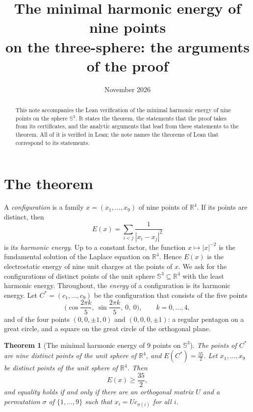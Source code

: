\documentclass[reqno,a4paper,11pt]{amsart}
\numberwithin{equation}{section}
\newtheorem{theorem}{Theorem}[section]
\def\R{{\mathbb R}}
\newcommand{\Sph}{\mathbb{S}}
\begin{document}
\title[The harmonic energy of nine points on the three-sphere]{The minimal harmonic energy of nine points\\ on the three-sphere: the arguments of the proof}

\date{November 2026}

\begin{abstract}
This note accompanies the Lean verification of the minimal harmonic energy of nine points on the sphere $\Sph^3$. It states the theorem, the statements that the proof takes from its certificates, and the analytic arguments that lead from these statements to the theorem. All of it is verified in Lean; the note names the theorems of Lean that correspond to its statements.
\end{abstract}

\maketitle

\section{The theorem}\label{sec:theorem}

A \emph{configuration} is a family $x = (x_1, \dots, x_9)$ of nine points of $\R^4$. If its points are distinct, then
$$
E(x) = \sum_{i<j} \frac{1}{|x_i - x_j|^2}
$$
is its \emph{harmonic energy}. Up to a constant factor, the function $x \mapsto |x|^{-2}$ is the fundamental solution of the Laplace equation on $\R^4$. Hence $E(x)$ is the electrostatic energy of nine unit charges at the points of $x$. We ask for the configurations of distinct points of the unit sphere $\Sph^3 \subseteq \R^4$ with the least harmonic energy. Throughout, the \emph{energy} of a configuration is its harmonic energy. Let $C^* = (c_1, \dots, c_9)$ be the configuration that consists of the five points
$$
\Big( \cos \frac{2 \pi k}{5}, \ \sin \frac{2 \pi k}{5}, \ 0, \ 0 \Big), \qquad k = 0, \dots, 4,
$$
and of the four points $(0, 0, \pm 1, 0)$ and $(0, 0, 0, \pm 1)$: a regular pentagon on a great circle, and a square on the great circle of the orthogonal plane.

\begin{theorem}[The minimal harmonic energy of $9$ points on $\Sph^3$]\label{thm:harmonic9}
The points of $C^*$ are nine distinct points of the unit sphere of $\R^4$, and $E(C^*) = \tfrac{35}{2}$. Let $x_1, \dots, x_9$ be distinct points of the unit sphere of $\R^4$. Then
$$
E(x) \geq \frac{35}{2} ,
$$
and equality holds if and only if there are an orthogonal matrix $U$ and a permutation $\sigma$ of $\{1, \dots, 9\}$ such that $x_i = U c_{\sigma(i)}$ for all $i$.
\end{theorem}
\end{document}
